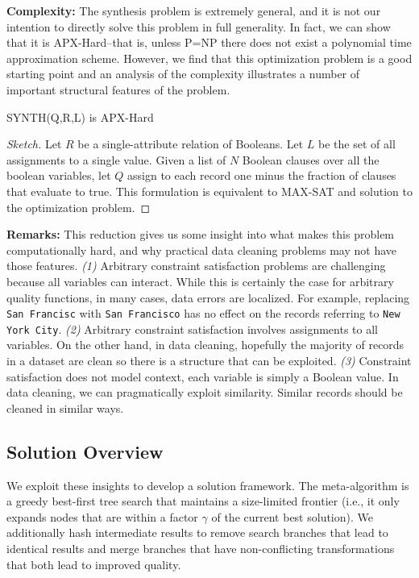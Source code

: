 \vspace{0.25em} \noindent\textbf{Complexity: } The synthesis problem is extremely general, and it is not our intention to directly solve this problem in full generality.
In fact, we can show that it is APX-Hard--that is, unless P=NP there does not exist a polynomial time approximation scheme.
However, we find that this optimization problem is a good starting point and an analysis of the complexity illustrates a number of important structural features of the problem.

\begin{proposition}
\textsf{SYNTH(Q,R,L)} is \textsf{APX-Hard}
\end{proposition}
\begin{proof}[Sketch]
Let $R$ be a single-attribute relation of Booleans. Let $L$ be the set of all assignments to a single value.
Given a list of $N$ Boolean clauses over all the boolean variables, let $Q$ assign to each record one minus the fraction of clauses that evaluate to true. This formulation is equivalent to MAX-SAT and solution to the optimization problem.
\end{proof}


\vspace{0.25em} \noindent\textbf{Remarks: } This reduction gives us some insight into what makes this problem computationally hard, and why practical data cleaning problems may not have those features. \emph{(1)} Arbitrary constraint satisfaction problems are challenging because all variables can interact. While this is certainly the case for arbitrary quality functions, in many cases, data errors are localized. For example, replacing \texttt{San Francisc} with \texttt{San Francisco} has no effect on the records referring to \texttt{New York City}.  \emph{(2)} Arbitrary constraint satisfaction involves assignments to all variables. On the other hand, in data cleaning, hopefully the majority of records in a dataset are clean so there is a structure that can be exploited.
 \emph{(3)} Constraint satisfaction does not model context, each variable is simply a Boolean value. In data cleaning, we can pragmatically exploit similarity. Similar records should be cleaned in similar ways.  

\subsection{Solution Overview}
We exploit these insights to develop a solution framework. The meta-algorithm is a greedy best-first tree search that maintains a size-limited frontier (i.e., it only expands nodes that are within a factor $\gamma$ of the current best solution).
We additionally hash intermediate results to remove search branches that lead to identical results and merge branches that have non-conflicting transformations that both lead to improved quality.

